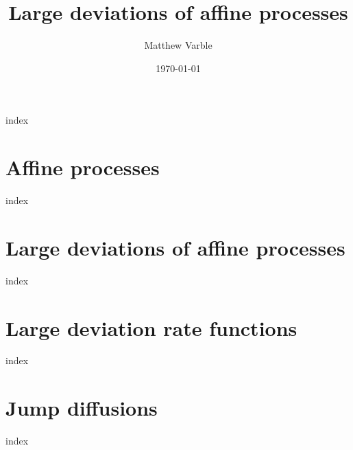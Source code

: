 \documentclass[leqno]{./preamble/dissertation}
\title{Large deviations of affine processes}
\author{Matthew Varble}
\date{\today}
\begin{document}
\maketitle

\frontmatter
{index}


\mainmatter

\chapter{Affine processes}
\label{affine-processes}
{index}

\chapter{Large deviations of affine processes}
\label{large-deviations}
{index}

\chapter{Large deviation rate functions}
\label{rate-functions}
{index}

\appendix

\chapter{Jump diffusions}
\label{jump-diffusions}
{index}

\clearpage

\end{document}
